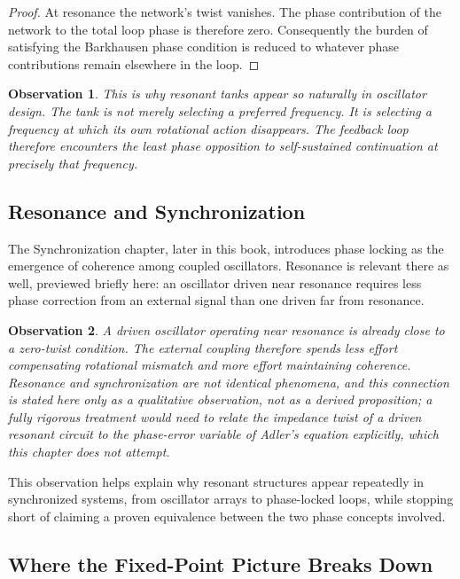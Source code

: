 \documentclass[12pt]{article}
\newtheorem{observation}{Observation}
\begin{document}
\begin{proof}
At resonance the network's twist vanishes. The phase contribution of the network to the total loop phase is therefore zero. Consequently the burden of satisfying the Barkhausen phase condition is reduced to whatever phase contributions remain elsewhere in the loop.
\end{proof}

\begin{observation}
This is why resonant tanks appear so naturally in oscillator design. The tank is not merely selecting a preferred frequency. It is selecting a frequency at which its own rotational action disappears. The feedback loop therefore encounters the least phase opposition to self-sustained continuation at precisely that frequency.
\end{observation}

\subsection{Resonance and Synchronization}

The Synchronization chapter, later in this book, introduces phase locking as the emergence of coherence among coupled oscillators. Resonance is relevant there as well, previewed briefly here: an oscillator driven near resonance requires less phase correction from an external signal than one driven far from resonance.

\begin{observation}
A driven oscillator operating near resonance is already close to a zero-twist condition. The external coupling therefore spends less effort compensating rotational mismatch and more effort maintaining coherence. Resonance and synchronization are not identical phenomena, and this connection is stated here only as a qualitative observation, not as a derived proposition; a fully rigorous treatment would need to relate the impedance twist of a driven resonant circuit to the phase-error variable of Adler's equation explicitly, which this chapter does not attempt.
\end{observation}

This observation helps explain why resonant structures appear repeatedly in synchronized systems, from oscillator arrays to phase-locked loops, while stopping short of claiming a proven equivalence between the two phase concepts involved.

\subsection{Where the Fixed-Point Picture Breaks Down}
\end{document}

